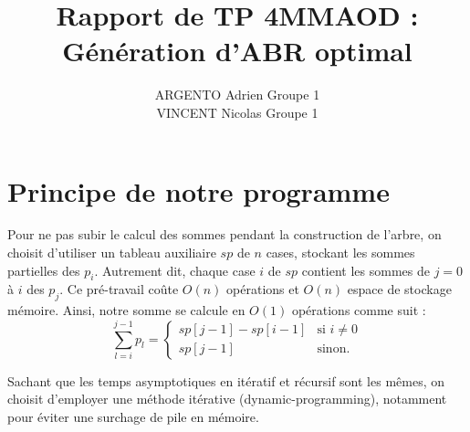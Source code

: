 \documentclass[a4paper, 10pt, french]{article}
\title{Rapport de TP 4MMAOD : Génération d'ABR optimal}
\author{
ARGENTO Adrien Groupe 1 
\\ VINCENT Nicolas Groupe 1 
}
\begin{document}
\maketitle

\section{Principe de notre  programme}
Pour ne pas subir le calcul des sommes pendant la construction de l'arbre, on choisit d'utiliser un tableau auxiliaire $sp$ de $n$ cases, stockant les sommes partielles des $p_i$. Autrement dit, chaque case $i$ de $sp$ contient les sommes de $j = 0$ à $i$ des $p_j$. Ce pré-travail coûte $O(n)$ opérations et $O(n)$ espace de stockage mémoire. Ainsi, notre somme se calcule en $O(1)$ opérations	 comme suit : $$\sum \limits_{l = i}^{j - 1} p_l =
  \left\{
  \begin{array}{ll}
    sp[j - 1] - sp[i - 1] & \mbox{si } i \neq 0 \\
    sp[j - 1]             & \mbox{sinon.}
  \end{array}
  \right.$$

Sachant que les temps asymptotiques en itératif et récursif sont les mêmes, on choisit d'employer une méthode itérative (dynamic-programming), notamment pour éviter une surchage de pile en mémoire. \par\leavevmode\par
\end{document}
